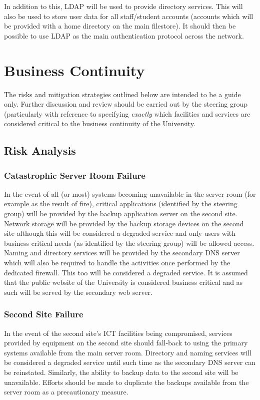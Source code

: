 \documentclass[a4paper, twoside]{article}
\begin{document}
In addition to this, LDAP will be used to provide directory services. This will
also be used to store user data for all staff/student accounts (accounts which
will be provided with a home directory on the main filestore). It should then be
possible to use LDAP as the main authentication protocol across the network.

\section{Business Continuity}
The risks and mitigation strategies outlined below are intended to be a guide
only. Further discussion and review should be carried out by the steering group
(particularly with reference to specifying \emph{exactly} which facilities and
services are considered critical to the business continuity of the University.

\subsection{Risk Analysis}
\subsubsection{Catastrophic Server Room Failure}
In the event of all (or most) systems becoming unavailable in the server room
(for example as the result of fire), critical applications (identified by the
steering group) will be provided by the backup application server on the second
site. Network storage will be provided by the backup storage devices on the
second site although this will be considered a degraded service and only users
with business critical needs (as identified by the steering group) will be
allowed access. Naming and directory services will be provided by the secondary
DNS server which will also be required to handle the activities once performed
by the dedicated firewall. This too will be considered a degraded service. It is
assumed that the public website of the University is considered business
critical and as such will be served by the secondary web server.

\subsubsection{Second Site Failure}
In the event of the second site's ICT facilities being compromised, services
provided by equipment on the second site should fall-back to using the primary
systems available from the main server room. Directory and naming services will
be considered a degraded service until such time as the secondary DNS server can
be reinstated. Similarly, the ability to backup data to the second site will be
unavailable. Efforts should be made to duplicate the backups available from the
server room as a precautionary measure.
\end{document}
